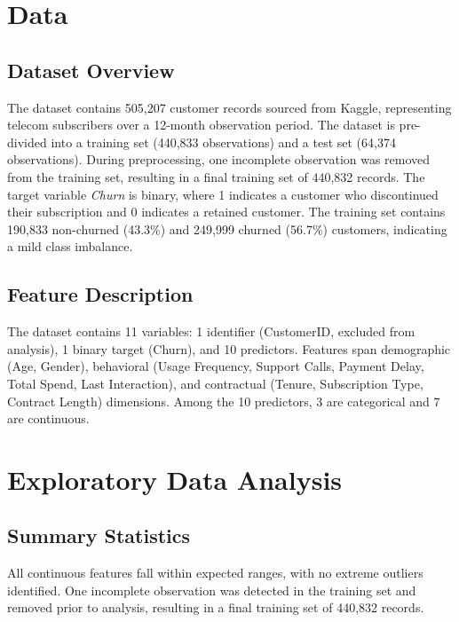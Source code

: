 \documentclass[12pt]{article}
\begin{document}
\section{Data}

\subsection{Dataset Overview}
The dataset contains 505,207 customer records sourced from Kaggle, representing 
telecom subscribers over a 12-month observation period. The dataset is pre-divided 
into a training set (440,833 observations) and a test set (64,374 observations). 
During preprocessing, one incomplete observation was removed from the training set, 
resulting in a final training set of 440,832 records. The target variable 
\textit{Churn} is binary, where 1 indicates a customer who discontinued their 
subscription and 0 indicates a retained customer. The training set contains 
190,833 non-churned (43.3\%) and 249,999 churned (56.7\%) customers, indicating 
a mild class imbalance.

\subsection{Feature Description}

The dataset contains 11 variables: 1 identifier (CustomerID, excluded from analysis), 
1 binary target (Churn), and 10 predictors. Features span demographic (Age, Gender), 
behavioral (Usage Frequency, Support Calls, Payment Delay, Total Spend, Last 
Interaction), and contractual (Tenure, Subscription Type, Contract Length) dimensions. 
Among the 10 predictors, 3 are categorical and 7 are continuous.
\section{Exploratory Data Analysis}

\subsection{Summary Statistics}

All continuous features fall within expected ranges, with no extreme outliers 
identified. One incomplete observation was detected in the training set and 
removed prior to analysis, resulting in a final training set of 440,832 records.
\end{document}
